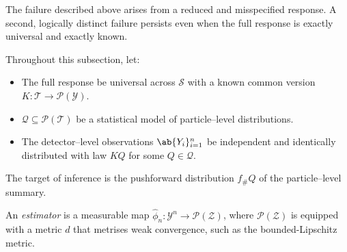 \documentclass[12pt]{article}
\newcommand{\Gens}{\mathcal{S}}
\newcommand{\Meas}{\mathcal{P}}
\newcommand{\1}{\mathbbm{1}}
\newcommand{\pushf}[1]{#1_{\#}}
\renewcommand{\[}{\begin{equation}}
\renewcommand{\]}{\end{equation}}
\begin{document}
    The failure described above arises from a reduced and misspecified response.
    A second, logically distinct failure persists even when the full response is exactly universal and exactly known.

    Throughout this subsection, let:
    \begin{itemize}
        \item The full response be universal across \(\Gens\) with a known common version \(K: \mathcal{T} \to \Meas(\mathcal{Y})\).
        \item \(\mathcal Q\subseteq\Meas(\mathcal T)\) be a statistical model of particle--level distributions.
        \item The detector--level observations \(\ab\{Y_i\}_{i=1}^n\) be independent and identically distributed with law \(KQ\) for some \(Q\in\mathcal Q\).
    \end{itemize}
    
    The target of inference is the pushforward distribution \(\pushf{f}Q\) of the particle--level summary.

    \begin{definition}[Estimator]
        An \emph{estimator} is a measurable map \(\widehat\phi_n: \mathcal{Y}^n \to \Meas(\mathcal{Z})\), where \(\Meas(\mathcal Z)\) is equipped with a metric \(d\) that metrises weak convergence, such as the bounded-Lipschitz metric.
    \end{definition}
    
\end{document}
